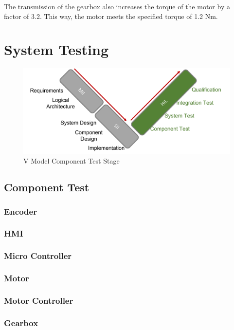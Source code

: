 The transmission of the gearbox also increases the torque of the motor by a factor of 3.2. This way, the motor meets the specified torque of 1.2 Nm.



\section{System Testing}
\begin{figure}
    \begin{center}
    \includegraphics[width=12cm]{Pictures/V Model Component Test.png}
    \caption[V Model Component Test]{V Model Component Test Stage}
    \label{V Model Component Test}
    \end{center}
\end{figure}
\subsection{Component Test}
\subsubsection{Encoder}
\subsubsection{HMI}
\subsubsection{Micro Controller}
\subsubsection{Motor}
\subsubsection{Motor Controller}
\subsubsection{Gearbox}

